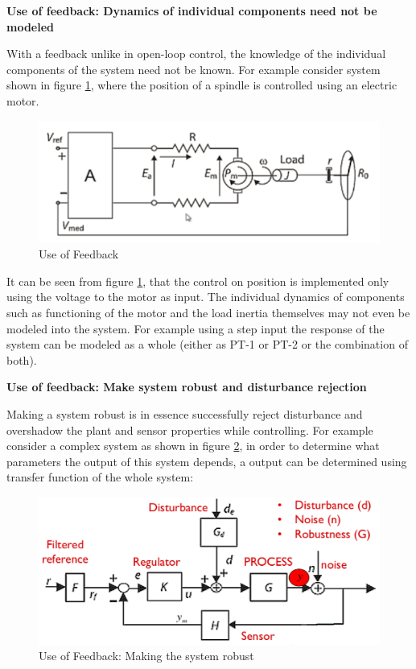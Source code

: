 \textbf{Use of feedback: Dynamics of individual components need not be modeled}

With a feedback unlike in open-loop control, the knowledge of the individual components of the system need not be known. For example consider system shown in figure \ref{fig_Feedback_Use1}, where the position of a spindle is controlled using an electric motor.
\begin{figure}[h!]
	\centering
	\includegraphics[width=0.8\linewidth]{Bilder/Feedback_Use1}
	\caption{Use of Feedback}
	\label{fig_Feedback_Use1}
\end{figure}
It can be seen from figure \ref{fig_Feedback_Use1}, that the control on position is implemented only using the voltage to the motor as input. The individual dynamics of components such as functioning of the motor and the load inertia themselves may not even be modeled into the system. For example using a step input the response of the system can be modeled as a whole (either as PT-1 or PT-2 or the combination of both).

\textbf{Use of feedback: Make system robust and disturbance rejection}

Making a system robust is in essence successfully reject disturbance and overshadow the plant and sensor properties while controlling. For example consider a complex system as shown in figure \ref{fig_Feedback_Use2}, in order to determine what parameters the output of this system depends, a output can be determined using transfer function of the whole system:
 \begin{figure}[h!]
 	\centering
 	\includegraphics[width=0.8\linewidth]{Bilder/Feedback_Use2}
 	\caption{Use of Feedback: Making the system robust}
 	\label{fig_Feedback_Use2}
 \end{figure}

